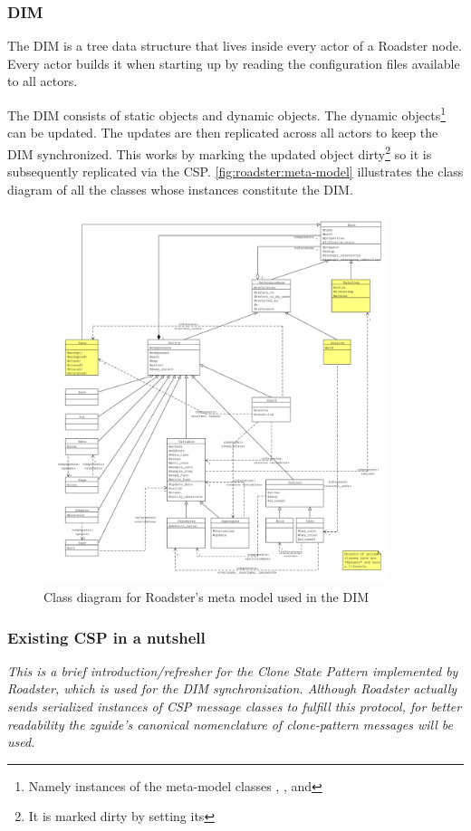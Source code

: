 \subsubsection{DIM}
The \acrfull{DIM} is a tree data structure that lives inside every actor of a Roadster
node. Every actor builds it when starting up by reading the configuration
files available to all actors.

The DIM consists of static objects and dynamic objects. The dynamic
objects\footnote{Namely instances of the meta-model classes ,
, and } can be updated. The updates are then
replicated across all actors to keep the DIM synchronized. This works by
marking the updated object dirty\footnote{It is marked dirty by setting its
} so it is subsequently replicated via the
\gls{CSP}. \autoref{fig:roadster:meta-model} illustrates the class diagram of
all the classes whose instances constitute the DIM.

\begin{figure}[]
	\includegraphics[trim=1.5cm 1cm 1cm 1cm, clip=true, width=0.9\textwidth]{img/meta_model.pdf}
	\caption{Class diagram for Roadster's meta model used in the DIM}
	\label{fig:roadster:meta-model}
\end{figure}

\subsubsection{Existing CSP in a nutshell}\label{sec:scope:csp}
\emph{This is a brief introduction/refresher for the Clone State Pattern
implemented by Roadster, which is used for the DIM synchronization. Although Roadster actually sends serialized instances
of CSP message classes to fulfill this protocol, for better readability the
\gls{zguide}'s canonical nomenclature of \gls{clone-pattern} messages will be used.}

